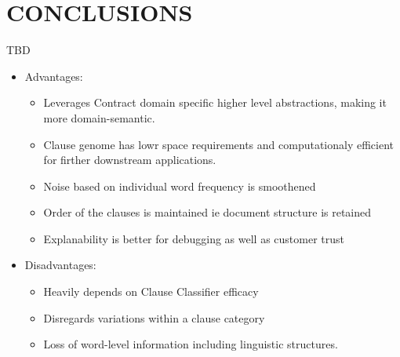 \documentclass[9pt,academicons]{article}
\begin{document}
\section{CONCLUSIONS}

TBD

 \begin{itemize}
 \item Advantages:
  \begin{itemize}
\item Leverages Contract domain specific higher level abstractions, making it more domain-semantic.
\item Clause genome has lowr space requirements and computationaly efficient for firther downstream applications.
\item Noise based on individual word frequency is smoothened
\item Order of the clauses is maintained ie document structure is retained
\item Explanability is better for debugging as well as customer trust
\end{itemize}
\item Disadvantages:
 \begin{itemize}
\item Heavily depends on Clause Classifier efficacy
\item Disregards variations within a clause category
\item Loss of word-level information including linguistic structures.
\end{itemize}
\end{itemize}
%








\bigskip
\end{document}
